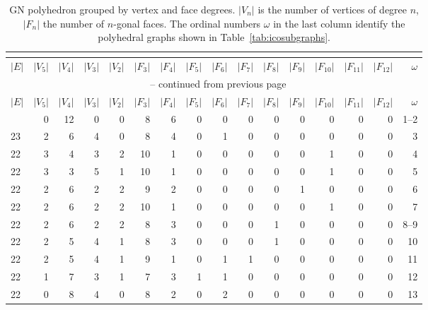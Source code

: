 \begin{appendix}
\footnotesize{\begin{longtable}{l@{\hskip 4pt}r@{\hskip 4pt}r@{\hskip 4pt}r@{\hskip 4pt}r@{\hskip 4pt}r@{\hskip 4pt}r@{\hskip 4pt}r@{\hskip 4pt}r@{\hskip 4pt}r@{\hskip 4pt}r@{\hskip 4pt}r@{\hskip 4pt}r@{\hskip 4pt}r@{\hskip 4pt}r@{\hskip 8pt}r}
    \caption{GN polyhedron grouped by vertex and face degrees. $|V_n|$ is the
    number of vertices of degree $n$, $|F_n|$ the number of $n$-gonal faces.
    The ordinal numbers $\omega$ in the last column identify the polyhedral
    graphs shown in Table~\ref{tab:icosubgraphs}.}\\
    \label{tab:verticesandfaces}\\
\toprule    
    $|E|$ & $|V_5|$ & $|V_4|$ & $|V_3|$ & $|V_2|$ & $|F_3|$ & $|F_4|$ & $|F_5|$ & $|F_6|$ & $|F_7|$ & $|F_8|$ & $|F_9|$ & $|F_{10}|$ & $|F_{11}|$ & $|F_{12}|$ & $\omega$ \\\midrule
\endfirsthead
\multicolumn{16}{c}{\tablename~\thetable{} -- continued from previous page}\\
\toprule
    $|E|$ & $|V_5|$ & $|V_4|$ & $|V_3|$ & $|V_2|$ & $|F_3|$ & $|F_4|$ & $|F_5|$ & $|F_6|$ & $|F_7|$ & $|F_8|$ & $|F_9|$ & $|F_{10}|$ & $|F_{11}|$ & $|F_{12}|$ & $\omega$ \\\midrule
\endhead
\bottomrule\endfoot
    24 & 0  & 12 & 0  & 0  & 8  & 6  & 0  & 0  & 0  & 0  & 0  & 0  & 0  & 0  & 1--2\\
    23 & 2  & 6  & 4  & 0  & 8  & 4  & 0  & 1  & 0  & 0  & 0  & 0  & 0  & 0  & 3  \\
    22 & 3  & 4  & 3  & 2  & 10 & 1  & 0  & 0  & 0  & 0  & 0  & 1  & 0  & 0  & 4  \\
    22 & 3  & 3  & 5  & 1  & 10 & 1  & 0  & 0  & 0  & 0  & 0  & 1  & 0  & 0  & 5  \\
    22 & 2  & 6  & 2  & 2  & 9  & 2  & 0  & 0  & 0  & 0  & 1  & 0  & 0  & 0  & 6  \\
    22 & 2  & 6  & 2  & 2  & 10 & 1  & 0  & 0  & 0  & 0  & 0  & 1  & 0  & 0  & 7  \\
    22 & 2  & 6  & 2  & 2  & 8  & 3  & 0  & 0  & 0  & 1  & 0  & 0  & 0  & 0  & 8--9\\
    22 & 2  & 5  & 4  & 1  & 8  & 3  & 0  & 0  & 0  & 1  & 0  & 0  & 0  & 0  & 10 \\
    22 & 2  & 5  & 4  & 1  & 9  & 1  & 0  & 1  & 1  & 0  & 0  & 0  & 0  & 0  & 11\\
    22 & 1  & 7  & 3  & 1  & 7  & 3  & 1  & 1  & 0  & 0  & 0  & 0  & 0  & 0  & 12 \\
    22 & 0  & 8  & 4  & 0  & 8  & 2  & 0  & 2  & 0  & 0  & 0  & 0  & 0  & 0  & 13\\

\end{longtable}}
\end{appendix}
